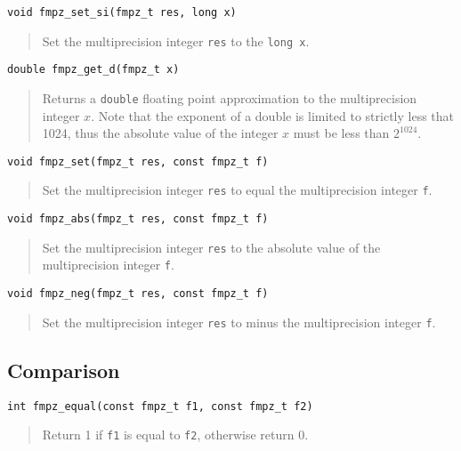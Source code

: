 \documentclass[a4paper,10pt]{article}
\newcommand{\code}{\lstinline}
\begin{document}
\begin{lstlisting}
void fmpz_set_si(fmpz_t res, long x)
\end{lstlisting}
\begin{quote}
Set the multiprecision integer \code{res} to the \code{long x}.
\end{quote}

\begin{lstlisting}
double fmpz_get_d(fmpz_t x) 
\end{lstlisting}
\begin{quote}
Returns a \code{double} floating point approximation to the multiprecision integer $x$. Note that the exponent of a double is limited to strictly less that 1024, thus the absolute value of the integer $x$ must be less than $2^{1024}$.
\end{quote}

\begin{lstlisting}
void fmpz_set(fmpz_t res, const fmpz_t f)
\end{lstlisting}
\begin{quote}
Set the multiprecision integer \code{res} to equal the multiprecision integer \code{f}.
\end{quote}

\begin{lstlisting}
void fmpz_abs(fmpz_t res, const fmpz_t f)
\end{lstlisting}
\begin{quote}
Set the multiprecision integer \code{res} to the absolute value of the multiprecision integer \code{f}.
\end{quote}

\begin{lstlisting}
void fmpz_neg(fmpz_t res, const fmpz_t f)
\end{lstlisting}
\begin{quote}
Set the multiprecision integer \code{res} to minus the multiprecision integer \code{f}.
\end{quote}

\subsection{Comparison}

\begin{lstlisting}
int fmpz_equal(const fmpz_t f1, const fmpz_t f2)
\end{lstlisting}
\begin{quote}
Return 1 if \code{f1} is equal to \code{f2}, otherwise return 0.
\end{quote}
\end{document}
